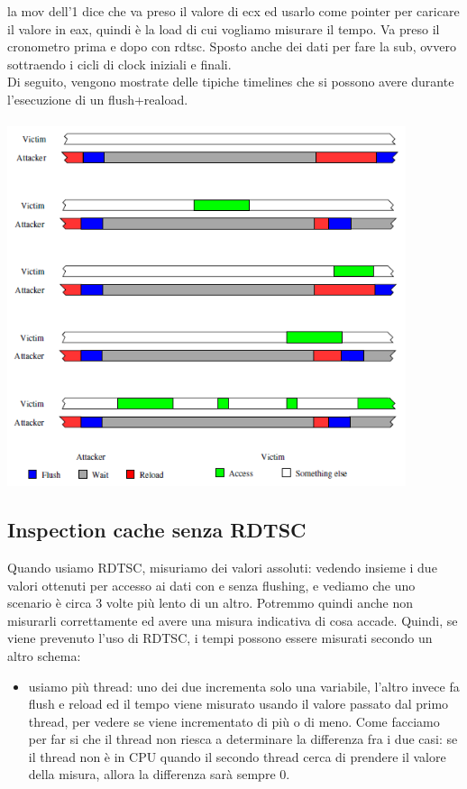 \documentclass[12pt, oneside]{extbook}
\begin{document}
la mov dell'1 dice che va preso il valore di ecx ed usarlo come pointer per caricare il valore in eax, quindi è la load di cui vogliamo misurare il tempo. Va preso il cronometro prima e dopo con rdtsc. Sposto anche dei dati per fare la sub, ovvero sottraendo i cicli di clock iniziali e finali.\\ Di seguito, vengono mostrate delle tipiche timelines che si possono avere durante l'esecuzione di un flush+reaload.\\\\
\includegraphics[scale=0.5]{immagini/flrel}
\subsection{Inspection cache senza RDTSC}
Quando usiamo RDTSC, misuriamo dei valori assoluti: vedendo insieme i due valori ottenuti per accesso ai dati con e senza flushing, e vediamo che uno scenario è circa 3 volte più lento di un altro. Potremmo quindi anche non misurarli correttamente ed avere una misura indicativa di cosa accade. Quindi, se viene prevenuto l'uso di RDTSC, i tempi possono essere misurati secondo un altro schema:
\begin{itemize}
\item usiamo più thread: uno dei due incrementa solo una variabile, l'altro invece fa flush e reload ed il tempo viene misurato usando il valore passato dal primo thread, per vedere se viene incrementato di più o di meno. Come facciamo per far si che il thread non riesca a determinare la differenza fra i due casi: se il thread non è in CPU quando il secondo thread cerca di prendere il valore della misura, allora la differenza sarà sempre 0.
\end{itemize}
\end{document}

